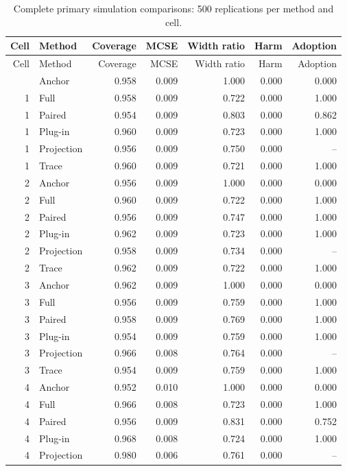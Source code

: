 \begingroup\setlength{\tabcolsep}{4pt}
\begin{longtable}{rlrrrrr}
\caption{Complete primary simulation comparisons: 500 replications per method and cell.}\label{tab:allsim}\\
\toprule
Cell & Method & Coverage & MCSE & Width ratio & Harm & Adoption\\
\midrule
\endfirsthead
\toprule
Cell & Method & Coverage & MCSE & Width ratio & Harm & Adoption\\
\midrule
\endhead
\bottomrule\endfoot
1 & Anchor & 0.958 & 0.009 & 1.000 & 0.000 & 0.000\\
1 & Full & 0.958 & 0.009 & 0.722 & 0.000 & 1.000\\
1 & Paired & 0.954 & 0.009 & 0.803 & 0.000 & 0.862\\
1 & Plug-in & 0.960 & 0.009 & 0.723 & 0.000 & 1.000\\
1 & Projection & 0.956 & 0.009 & 0.750 & 0.000 & --\\
1 & Trace & 0.960 & 0.009 & 0.721 & 0.000 & 1.000\\
2 & Anchor & 0.956 & 0.009 & 1.000 & 0.000 & 0.000\\
2 & Full & 0.960 & 0.009 & 0.722 & 0.000 & 1.000\\
2 & Paired & 0.956 & 0.009 & 0.747 & 0.000 & 1.000\\
2 & Plug-in & 0.962 & 0.009 & 0.723 & 0.000 & 1.000\\
2 & Projection & 0.958 & 0.009 & 0.734 & 0.000 & --\\
2 & Trace & 0.962 & 0.009 & 0.722 & 0.000 & 1.000\\
3 & Anchor & 0.962 & 0.009 & 1.000 & 0.000 & 0.000\\
3 & Full & 0.956 & 0.009 & 0.759 & 0.000 & 1.000\\
3 & Paired & 0.958 & 0.009 & 0.769 & 0.000 & 1.000\\
3 & Plug-in & 0.954 & 0.009 & 0.759 & 0.000 & 1.000\\
3 & Projection & 0.966 & 0.008 & 0.764 & 0.000 & --\\
3 & Trace & 0.954 & 0.009 & 0.759 & 0.000 & 1.000\\
4 & Anchor & 0.952 & 0.010 & 1.000 & 0.000 & 0.000\\
4 & Full & 0.966 & 0.008 & 0.723 & 0.000 & 1.000\\
4 & Paired & 0.956 & 0.009 & 0.831 & 0.000 & 0.752\\
4 & Plug-in & 0.968 & 0.008 & 0.724 & 0.000 & 1.000\\
4 & Projection & 0.980 & 0.006 & 0.761 & 0.000 & --\\

\end{longtable}
